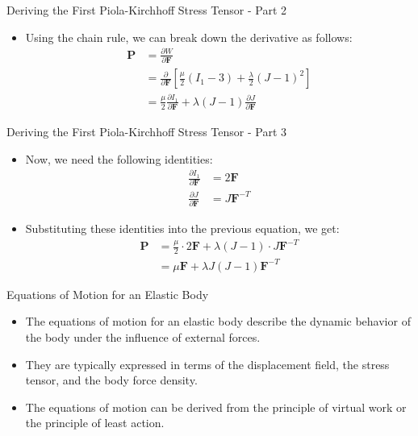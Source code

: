 \documentclass{beamer}
\begin{document}
\begin{frame}{Deriving the First Piola-Kirchhoff Stress Tensor - Part 2}
\begin{itemize}
\item Using the chain rule, we can break down the derivative as follows:
\begin{align*}
\mathbf{P} &= \frac{\partial W}{\partial \mathbf{F}} \\
&= \frac{\partial}{\partial \mathbf{F}} \left[ \frac{\mu}{2} (I_1 - 3) + \frac{\lambda}{2} (J - 1)^2 \right] \\
&= \frac{\mu}{2} \frac{\partial I_1}{\partial \mathbf{F}} + \lambda (J - 1) \frac{\partial J}{\partial \mathbf{F}}
\end{align*}
\end{itemize}
\end{frame}

\begin{frame}{Deriving the First Piola-Kirchhoff Stress Tensor - Part 3}
\begin{itemize}
\item Now, we need the following identities:
\begin{align*}
\frac{\partial I_1}{\partial \mathbf{F}} &= 2 \mathbf{F} \\
\frac{\partial J}{\partial \mathbf{F}} &= J \mathbf{F}^{-T}
\end{align*}
\item Substituting these identities into the previous equation, we get:
\begin{align*}
\mathbf{P} &= \frac{\mu}{2} \cdot 2 \mathbf{F} + \lambda (J - 1) \cdot J \mathbf{F}^{-T} \\
&= \mu \mathbf{F} + \lambda J (J - 1) \mathbf{F}^{-T}
\end{align*}
\end{itemize}
\end{frame}

\begin{frame}{Equations of Motion for an Elastic Body}
    \begin{itemize}
        \item The equations of motion for an elastic body describe the dynamic behavior of the body under the influence of external forces.
        \item They are typically expressed in terms of the displacement field, the stress tensor, and the body force density.
        \item The equations of motion can be derived from the principle of virtual work or the principle of least action.
    \end{itemize}
\end{frame}
\end{document}

